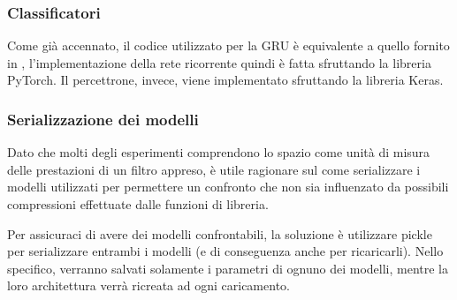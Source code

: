 \documentclass[../../main.tex]{subfiles}
\begin{document}
    \subsubsection{Classificatori}
    Come già accennato, il codice utilizzato per la GRU è equivalente a quello fornito in \cite{ma2020}, l'implementazione della rete ricorrente quindi è fatta sfruttando la libreria PyTorch. Il percettrone, invece, viene implementato sfruttando la libreria Keras.

    \subsubsection{Serializzazione dei modelli}
    Dato che molti degli esperimenti comprendono lo spazio come unità di misura delle prestazioni di un filtro appreso, è utile ragionare sul come serializzare i modelli utilizzati per permettere un confronto che non sia influenzato da possibili compressioni effettuate dalle funzioni di libreria.

    Per assicuraci di avere dei modelli confrontabili, la soluzione è utilizzare pickle per serializzare entrambi i modelli (e di conseguenza anche per ricaricarli). Nello specifico, verranno salvati solamente i parametri di ognuno dei modelli, mentre la loro architettura verrà ricreata ad ogni caricamento.
    
\end{document}

